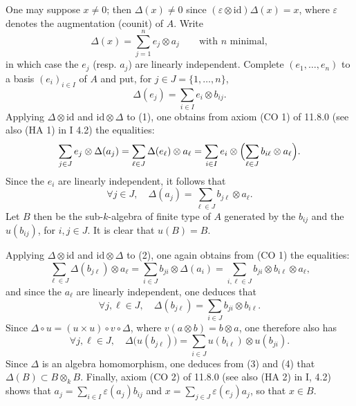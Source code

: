 One may suppose $x\ne0$; then $\Delta(x)\ne0$ since $(\varepsilon\otimes\mathrm{id})\Delta(x)=x$, where $\varepsilon$ denotes the augmentation (counit) of $A$. Write
\begin{equation*}\tag{1}
\Delta(x)=\sum_{j=1}^n e_j\otimes a_j\qquad\text{with $n$ minimal},
\end{equation*}
in which case the $e_j$ (resp. $a_j$) are linearly independent. Complete $(e_1,\ldots,e_n)$ to a basis $(e_i)_{i\in I}$ of $A$ and put, for $j\in J=\{1,\ldots,n\}$,
\[
\Delta(e_j)=\sum_{i\in I}e_i\otimes b_{ij}.
\]
Applying $\Delta\otimes\mathrm{id}$ and $\mathrm{id}\otimes\Delta$ to (1), one obtains from axiom (CO 1) of 11.8.0 (see also (HA 1) in I 4.2) the equalities:
\[
\sum_{j\in J}e_j\otimes\Delta(a_j)=\sum_{\ell\in J}\Delta(e_\ell)\otimes a_\ell=\sum_{i\in I}e_i\otimes\Bigl(\sum_{\ell\in J}b_{i\ell}\otimes a_\ell\Bigr).
\]
Since the $e_i$ are linearly independent, it follows that
\begin{equation*}\tag{2}
\forall j\in J,\quad\Delta(a_j)=\sum_{\ell\in J}b_{j\ell}\otimes a_\ell.
\end{equation*}
Let $B$ then be the sub-$k$-algebra of finite type of $A$ generated by the $b_{ij}$ and the $u(b_{ij})$, for $i,j\in J$. It is clear that $u(B)=B$.

Applying $\Delta\otimes\mathrm{id}$ and $\mathrm{id}\otimes\Delta$ to (2), one again obtains from (CO 1) the equalities:
\[
\sum_{\ell\in J}\Delta(b_{j\ell})\otimes a_\ell=\sum_{i\in J}b_{ji}\otimes\Delta(a_i)=\sum_{i,\ell\in J}b_{ji}\otimes b_{i\ell}\otimes a_\ell,
\]
and since the $a_\ell$ are linearly independent, one deduces that
\begin{equation*}\tag{3}
\forall j,\ell\in J,\quad\Delta(b_{j\ell})=\sum_{i\in J}b_{ji}\otimes b_{i\ell}.
\end{equation*}
Since $\Delta\circ u=(u\times u)\circ v\circ\Delta$, where $v(a\otimes b)=b\otimes a$, one therefore also has
\begin{equation*}\tag{4}
\forall j,\ell\in J,\quad\Delta\bigl(u(b_{j\ell})\bigr)=\sum_{i\in J}u(b_{i\ell})\otimes u(b_{ji}).
\end{equation*}
Since $\Delta$ is an algebra homomorphism, one deduces from (3) and (4) that $\Delta(B)\subset B\otimes_k B$. Finally, axiom (CO 2) of 11.8.0 (see also (HA 2) in I, 4.2) shows that $a_j=\sum_{i\in I}\varepsilon(a_j)b_{ij}$ and $x=\sum_{j\in J}\varepsilon(e_j)a_j$, so that $x\in B$.

